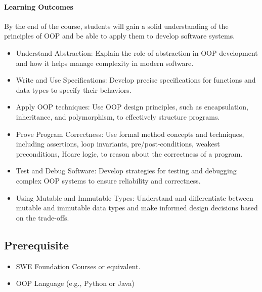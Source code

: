 \documentclass[11pt]{article}
\begin{document}
\paragraph{Learning Outcomes}
By the end of the course, students will gain a solid understanding of the principles of OOP and be able to apply them to develop software systems.
\begin{itemize}
\item Understand Abstraction: Explain the role of abstraction in OOP development and how it helps manage complexity in modern software.
\item Write and Use Specifications: Develop precise specifications for functions and data types to specify their behaviors.
\item Apply OOP techniques: Use OOP design principles, such as encapsulation, inheritance, and polymorphism, to effectively structure programs.
\item Prove Program Correctness: Use formal method concepts and techniques, including assertions, loop invariants, pre/post-conditions, weakest preconditions, Hoare logic, to reason about the correctness of a program.
\item Test and Debug Software: Develop strategies for testing and debugging complex OOP systems to ensure reliability and correctness.
\item Using Mutable and Immutable Types: Understand and differentiate between mutable and immutable data types and make informed design decisions based on the trade-offs.
\end{itemize}

\subsection{Prerequisite}
\begin{itemize}
\item SWE Foundation Courses or equivalent.
\item OOP Language (e.g., Python or Java)
\end{itemize}
\end{document}

